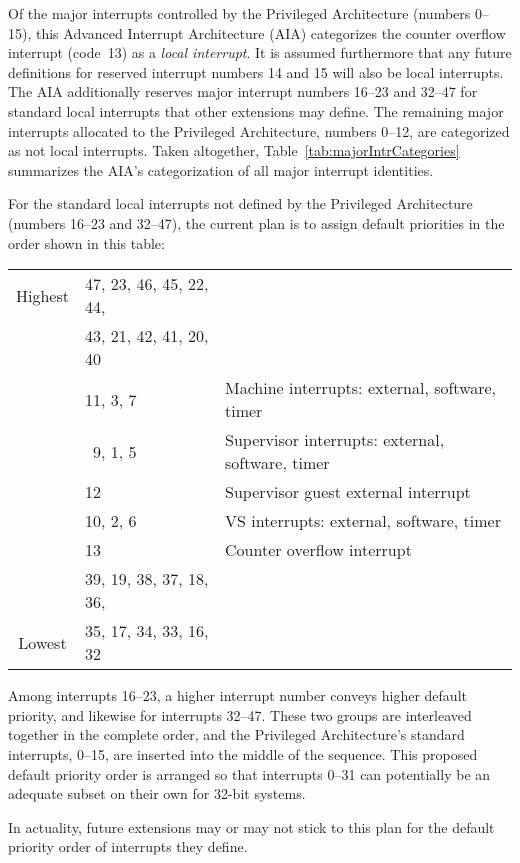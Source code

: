 Of the major interrupts controlled by the Privileged Architecture
(numbers 0--15), this Advanced Interrupt Architecture (AIA) categorizes the
counter overflow interrupt (code~13) as a \emph{local interrupt}.
It is assumed furthermore that any future definitions for
reserved interrupt numbers 14 and 15 will also be local interrupts.
The AIA additionally reserves
major interrupt numbers 16--23 and 32--47 for
standard local interrupts that other {\RISCV} extensions may define.
The remaining major interrupts allocated to the Privileged
Architecture, numbers 0--12, are categorized as not local interrupts.
Taken altogether, Table~\ref{tab:majorIntrCategories}
summarizes the AIA's categorization
of all major interrupt identities.

\begin{commentary}
For the standard local interrupts not defined by the
{\RISCV} Privileged Architecture (numbers 16--23 and 32--47),
the current plan is to assign default priorities
in the order shown in this table:
\begin{center}
\begin{tabular}{|c|l|l|}
\hline
Highest & 47, 23, 46, 45, 22, 44, & \\
        & 43, 21, 42, 41, 20, 40  & \\
\cline{2-3}
        & 11, 3, 7   & Machine interrupts:  external, software, timer \\
        & \ 9, 1, 5  & Supervisor interrupts:  external, software, timer \\
        & 12         & Supervisor guest external interrupt \\
        & 10, 2, 6   & VS interrupts:  external, software, timer \\
        & 13         & Counter overflow interrupt \\
\cline{2-3}
        & 39, 19, 38, 37, 18, 36, & \\
Lowest  & 35, 17, 34, 33, 16, 32  & \\
\hline
\end{tabular}
\end{center}
Among interrupts 16--23, a higher interrupt number conveys
higher default priority, and likewise for interrupts 32--47.
These two groups are interleaved together in the complete order,
and the Privileged Architecture's standard interrupts, 0--15,
are inserted into the middle of the sequence.
This proposed default priority order is arranged so that
interrupts 0--31 can potentially be an adequate subset on their
own for \mbox{32-bit} {\RISCV} systems.

In actuality, future {\RISCV} extensions may or may not stick to
this plan for the default priority order of interrupts they define.
\end{commentary}

